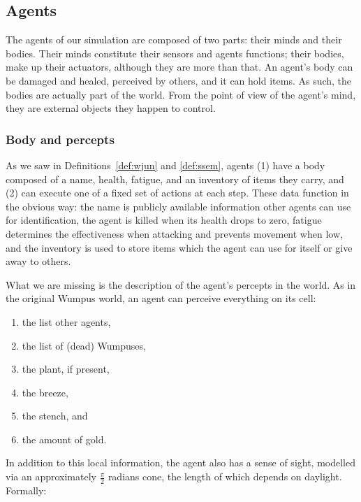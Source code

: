 \subsection{Agents}

The agents of our simulation are composed of two parts: their minds and their bodies. Their minds constitute their sensors and agents functions; their bodies, make up their actuators, although they are more than that. An agent's body can be damaged and healed, perceived by others, and it can hold items. As such, the bodies are actually part of the world. From the point of view of the agent's mind, they are external objects they happen to control.

\subsubsection{Body and percepts}

As we saw in Definitions~\ref{def:wjun} and \ref{def:ssem}, agents (1) have a body composed of a name, health, fatigue, and an inventory of items they carry, and (2) can execute one of a fixed set of actions at each step. These data function in the obvious way: the name is publicly available information other agents can use for identification, the agent is killed when its health drops to zero, fatigue determines the effectiveness when attacking and prevents movement when low, and the inventory is used to store items which the agent can use for itself or give away to others.

What we are missing is the description of the agent's percepts in the world. As in the original Wumpus world, an agent can perceive everything on its cell:
	\begin{enumerate}
		\item the list other agents,
		\item the list of (dead) Wumpuses,
		\item the plant, if present,
		\item the breeze,
		\item the stench, and
		\item the amount of gold.
	\end{enumerate}
	
In addition to this local information, the agent also has a sense of sight, modelled via an approximately $\frac{\pi}{2}$ radians cone, the length of which depends on daylight. Formally:

